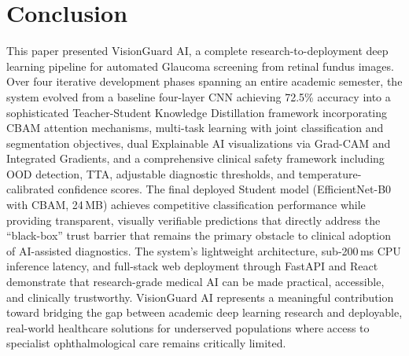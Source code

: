 \documentclass[conference]{IEEEtran}
\begin{document}
\section{Conclusion}

This paper presented VisionGuard AI, a complete research-to-deployment deep learning pipeline for automated Glaucoma screening from retinal fundus images. Over four iterative development phases spanning an entire academic semester, the system evolved from a baseline four-layer CNN achieving 72.5\% accuracy into a sophisticated Teacher-Student Knowledge Distillation framework incorporating CBAM attention mechanisms, multi-task learning with joint classification and segmentation objectives, dual Explainable AI visualizations via Grad-CAM and Integrated Gradients, and a comprehensive clinical safety framework including OOD detection, TTA, adjustable diagnostic thresholds, and temperature-calibrated confidence scores. The final deployed Student model (EfficientNet-B0 with CBAM, 24\,MB) achieves competitive classification performance while providing transparent, visually verifiable predictions that directly address the ``black-box'' trust barrier that remains the primary obstacle to clinical adoption of AI-assisted diagnostics. The system's lightweight architecture, sub-200\,ms CPU inference latency, and full-stack web deployment through FastAPI and React demonstrate that research-grade medical AI can be made practical, accessible, and clinically trustworthy. VisionGuard AI represents a meaningful contribution toward bridging the gap between academic deep learning research and deployable, real-world healthcare solutions for underserved populations where access to specialist ophthalmological care remains critically limited.
\end{document}
